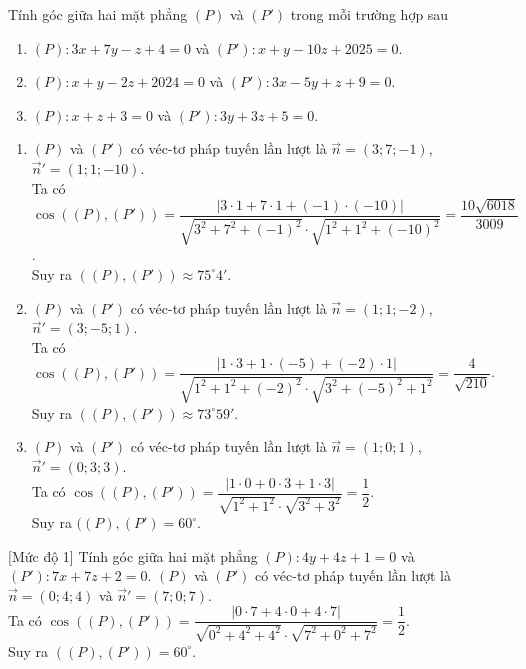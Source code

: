 \begin{bt}%
	Tính góc giữa hai mặt phẳng $(P)$ và $(P')$ trong mỗi trường hợp sau
	\begin{enumerate}
		\item $(P)\colon 3x+7y-z+4=0$ và $(P')\colon x+y-10z+2025=0$.
		\item $(P)\colon x+y-2z+2024=0$ và $(P')\colon 3x-5y+z+9=0$.
		\item $(P)\colon x+z+3=0$ và $(P')\colon 3y+3z+5=0$.
	\end{enumerate}
	\loigiai
	{
		\begin{enumerate}
			\item $(P)$ và $(P')$ có véc-tơ pháp tuyến lần lượt là $\overrightarrow{n}=(3;7;-1)$, $\overrightarrow{n}'=(1;1;-10)$.\\
			Ta có $\cos\left ((P),(P') \right )=\dfrac{\left |3\cdot 1+7\cdot 1+(-1)\cdot (-10) \right |}{\sqrt{3^2+7^2+(-1)^2}\cdot\sqrt{1^2+1^2+(-10)^2}}=\dfrac{10\sqrt{6018}}{3009}$.\\
			Suy ra $((P),(P'))\approx 75^{\circ}4'$.
			\item $(P)$ và $(P')$ có véc-tơ pháp tuyến lần lượt là $\overrightarrow{n}=(1;1;-2)$, $\overrightarrow{n}'=(3;-5;1)$.\\
			Ta có $\cos\left ((P),(P') \right )=\dfrac{\left |1\cdot 3+1\cdot (-5)+(-2)\cdot 1 \right |}{\sqrt{1^2+1^2+(-2)^2}\cdot\sqrt{3^2+(-5)^2+1^2}}=\dfrac{4}{\sqrt{210}}$.\\
			Suy ra $((P),(P'))\approx 73^{\circ}59'$.
			\item $(P)$ và $(P')$ có véc-tơ pháp tuyến lần lượt là $\overrightarrow{n}=(1;0;1)$, $\overrightarrow{n}'=(0;3;3)$.\\
			Ta có $\cos\left ((P),(P') \right )=\dfrac{\left |1\cdot 0+0\cdot 3+1\cdot 3 \right |}{\sqrt{1^2+1^2}\cdot\sqrt{3^2+3^2}}=\dfrac{1}{2}$.\\
			Suy ra $((P),(P')=60^{\circ}$.
		\end{enumerate}
	}
\end{bt}

\begin{bt}%
[Mức độ 1]%
	Tính góc giữa hai mặt phẳng $(P)\colon 4y+4z+1=0$ và $(P')\colon 7x+7z+2=0$.
	\loigiai
	{
		$(P)$ và $(P')$ có véc-tơ pháp tuyến lần lượt là $\overrightarrow{n}=(0;4;4)$ và $\overrightarrow{n}'=(7;0;7)$.\\
		Ta có $\cos \left ((P),(P') \right )=\dfrac{\left |0\cdot 7+4\cdot 0+4\cdot 7 \right |}{\sqrt{0^2+4^2+4^2}\cdot\sqrt{7^2+0^2+7^2}}=\dfrac{1}{2}$.\\
		Suy ra $\left ((P),(P') \right )=60^{\circ}$.
	}
\end{bt}

